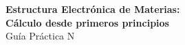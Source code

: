 \documentclass[10pt]{article}
\begin{document}

\begin{center}
 {\large \bf Estructura Electrónica de Materias: \\
 Cálculo desde primeros principios} \\
 
\vspace{0.25cm}
 Guía Práctica N
\end{center}
\end{document}
